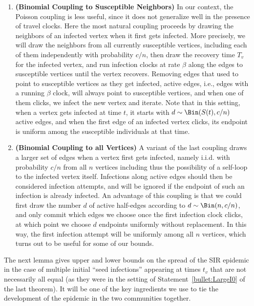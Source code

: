 \documentclass[11pt]{article}
\begin{document}
\begin{enumerate}
\begin{enumerate}
\item  \textbf{(Binomial Coupling to Susceptible Neighbors)} In our context, the Poisson coupling is less useful, since it does not generalize well in the presence of travel clocks.  Here the most natural coupling proceeds by drawing the neighbors of an infected vertex when it first gets infected.  More precisely, we will draw the neighbors  from all currently susceptible vertices, including each of them independently with probability $c/n$, then draw the recovery time $T_v$ for the infected vertex, and run infection clocks at rate $\beta$ along the edges to susceptible vertices until the vertex recovers.  Removing edges that used to point to susceptible vertices as they get infected, active edges, i.e., edges with a running $\beta$ clock, will always point to susceptible vertices, and when one of them clicks, we infect the new vertex and iterate.  
Note that in this setting, when a vertex gets infected at time $t$, it starts with $d\sim \Bin(S(t),c/n)$ active edges, and when the first edge of an infected vertex clicks, its endpoint is uniform among the susceptible individuals at that time.

\item \textbf{(Binomial Coupling to all Vertices)} A variant of the last coupling draws a larger set of edges when a vertex first gets infected, namely i.i.d. with probability $c/n$ from all $n$ vertices including thus the possibility of a self-loop to the infected vertex itself. Infections along active edges should then be considered infection attempts, and will be ignored if the endpoint of such an infection is already infected.  An advantage of this coupling is that we could first draw the number $d$ of active half-edges according to $d\sim \Bin(n,c/n)$, and only commit which edges we choose once the first infection clock clicks, at which point we choose $d$ endpoints uniformly without replacement.  In this way, the first infection attempt will be uniformly among all $n$ vertices, which turns out to be useful for some of our bounds.
\end{enumerate}
\end{enumerate}


\noindent The next lemma gives upper and lower bounds on the spread of the SIR epidemic
in the case of multiple initial ``seed infections'' appearing at times $t_v$ that are not necessarily all equal (as they were in the setting of Statement~\ref{bullet:LargeI0} of the last theorem). It will be one of the key ingredients we use to tie the development of the epidemic in the two communities together.
\end{document}
